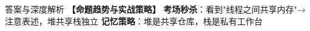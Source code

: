 \documentclass[12pt, a4paper]{ctexart}
\begin{document}
\begin{enumerate}[label=\textbf{\arabic*.}]
\begin{bluebox}{答案与深度解析}
		      \textbf{【命题趋势与实战策略】}
		      \textbf{考场秒杀}：看到"线程之间共享内存"→注意表述，堆共享栈独立
		      \textbf{记忆策略}：堆是共享仓库，栈是私有工作台
	      \end{bluebox}

\end{enumerate}
\end{document}
